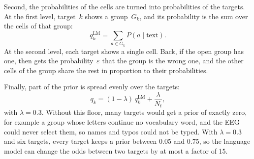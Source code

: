 Second, the probabilities of the cells are turned into probabilities of the targets.
At the first level, target~$k$ shows a group~$G_k$, and its probability is the sum
over the cells of that group:
\begin{equation}
    q_k^{\mathrm{LM}} = \sum_{a \in G_k} P(a \mid \text{text}).
    \label{eq:target-prior}
\end{equation}
At the second level, each target shows a single cell. Back, if the open group has one,
then gets the probability~$\varepsilon$ that the group is the wrong one, and the other
cells of the group share the rest in proportion to their probabilities.

Finally, part of the prior is spread evenly over the targets:
\begin{equation}
    q_k = (1 - \lambda)\, q_k^{\mathrm{LM}} + \frac{\lambda}{N_t},
    \label{eq:floor}
\end{equation}
with $\lambda = 0.3$. Without this floor, many targets would get a prior of exactly
zero, for example a group whose letters continue no vocabulary word, and the \ac{EEG}
could never select them, so names and typos could not be typed. With $\lambda = 0.3$
and six targets, every target keeps a prior between 0.05 and 0.75, so the language
model can change the odds between two targets by at most a factor of 15.
